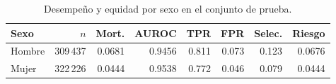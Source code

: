 
\begin{table}[htbp]
\centering
\small\setlength{\tabcolsep}{4pt}
\caption{Desempeño y equidad por sexo en el conjunto de prueba.}
\label{tab:sexo}
\begin{tabular}{l r r r r r r r}
\toprule
Sexo & $n$ & Mort. & AUROC & TPR & FPR & Selec. & Riesgo \\
\midrule
Hombre & 309\,437 & 0.0681 & 0.9456 & 0.811 & 0.073 & 0.123 & 0.0676 \\
Mujer & 322\,226 & 0.0444 & 0.9538 & 0.772 & 0.046 & 0.079 & 0.0444 \\
\bottomrule
\end{tabular}
\end{table}
